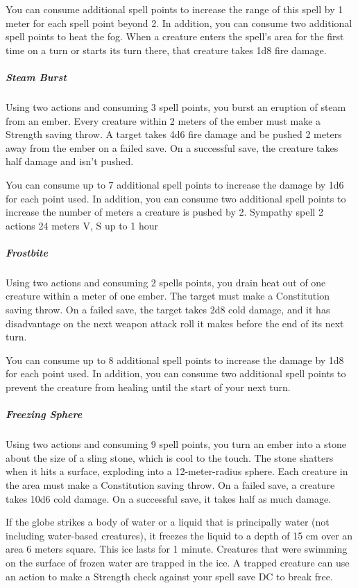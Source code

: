             You can consume additional spell points to increase the range of this spell by 1 meter for each spell point beyond 2.
            In addition, you can consume two additional spell points to heat the fog.
            When a creature enters the spell's area for the first time on a turn or starts its turn there, that creature takes 1d8 fire damage.
        \subparagraph{Steam Burst}
            Using two actions and consuming 3 spell points, you burst an eruption of steam from an ember.
            Every creature within 2 meters of the ember must make a Strength saving throw.
            A target takes 4d6 fire damage and be pushed 2 meters away from the ember on a failed save.
            On a successful save, the creature takes half damage and isn't pushed.

            You can consume up to 7 additional spell points to increase the damage by 1d6 for each point used.
            In addition, you can consume two additional spell points to increase the number of meters a creature is pushed by 2.
        {Sympathy spell}
        {2 actions}
        {24 meters}
        {V, S}
        {up to 1 hour}
        \subparagraph{Frostbite}
            Using two actions and consuming 2 spells points, you drain heat out of one creature within a meter of one ember.
            The target must make a Constitution saving throw.
            On a failed save, the target takes 2d8 cold damage, and it has disadvantage on the next weapon attack roll it makes before the end of its next turn.

            You can consume up to 8 additional spell points to increase the damage by 1d8 for each point used.
            In addition, you can consume two additional spell points to prevent the creature from healing until the start of your next turn.
        \subparagraph{Freezing Sphere}
            Using two actions and consuming 9 spell points, you turn an ember into a stone about the size of a sling stone, which is cool to the touch.
            The stone shatters when it hits a surface, exploding into a 12-meter-radius sphere.
            Each creature in the area must make a Constitution saving throw.
            On a failed save, a creature takes 10d6 cold damage.
            On a successful save, it takes half as much damage.

            If the globe strikes a body of water or a liquid that is principally water (not including water-based creatures), it freezes the liquid to a depth of 15 cm over an area 6 meters square.
            This ice lasts for 1 minute.
            Creatures that were swimming on the surface of frozen water are trapped in the ice.
            A trapped creature can use an action to make a Strength check against your spell save DC to break free.

